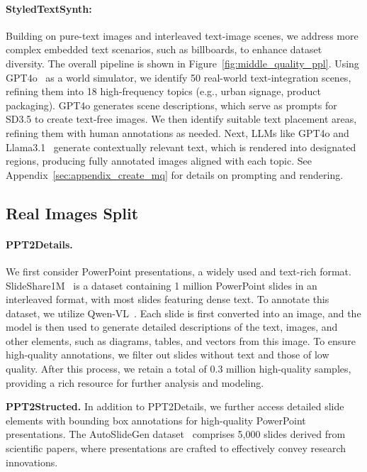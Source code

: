\paragraph{StyledTextSynth:}
Building on pure-text images and interleaved text-image scenes, we address more complex embedded text scenarios, such as billboards, to enhance dataset diversity. The overall pipeline is shown in Figure~\ref{fig:middle_quality_ppl}.
Using GPT4o~\cite{gpt4o} as a world simulator, we identify 50 real-world text-integration scenes, refining them into 18 high-frequency topics (e.g., urban signage, product packaging). GPT4o generates scene descriptions, which serve as prompts for SD3.5 to create text-free images. We then identify suitable text placement areas, refining them with human annotations as needed.
Next, LLMs like GPT4o and Llama3.1~\cite{llama3h} generate contextually relevant text, which is rendered into designated regions, producing fully annotated images aligned with each topic. See Appendix~\ref{sec:appendix_create_mq} for details on prompting and rendering.


\subsection{Real Images Split}

\paragraph{PPT2Details.}
We first consider PowerPoint presentations, a widely used and text-rich format.
SlideShare1M~\cite{araujo2016slideshare} is a dataset containing 1 million PowerPoint slides in an interleaved format, with most slides featuring dense text.
To annotate this dataset, we utilize Qwen-VL~\cite{qwen2_vl}. 
Each slide is first converted into an image, and the model is then used to generate detailed descriptions of the text, images, and other elements, such as diagrams, tables, and vectors from this image.
To ensure high-quality annotations, we filter out slides without text and those of low quality. 
After this process, we retain a total of 0.3 million high-quality samples, providing a rich resource for further analysis and modeling.

\textbf{PPT2Structed.}
In addition to PPT2Details, we further access detailed slide elements with bounding box annotations for high-quality PowerPoint presentations. 
The AutoSlideGen dataset~\cite{autoslidegen} comprises 5,000 slides derived from scientific papers, where presentations are crafted to effectively convey research innovations.

